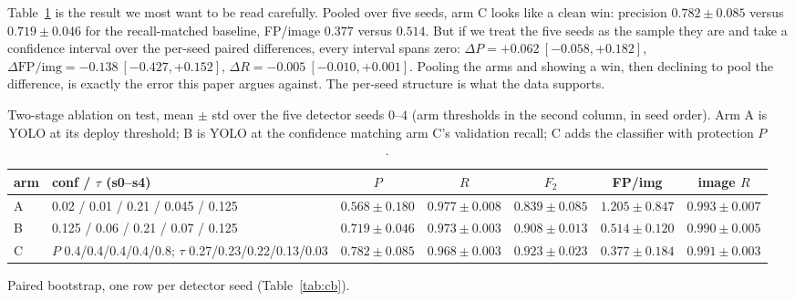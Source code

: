 Table~\ref{tab:twostage} is the result we most want to be read carefully. Pooled
over five seeds, arm C looks like a clean win: precision $0.782 \pm 0.085$ versus
$0.719 \pm 0.046$ for the recall-matched baseline, FP/image $0.377$ versus
$0.514$. But if we treat the five seeds as the sample they are and take a
confidence interval over the per-seed paired differences, every interval spans
zero: $\Delta P = +0.062\ [-0.058, +0.182]$,
$\Delta \mathrm{FP/img} = -0.138\ [-0.427, +0.152]$,
$\Delta R = -0.005\ [-0.010, +0.001]$. Pooling the arms and showing a win, then
declining to pool the difference, is exactly the error this paper argues against.
The per-seed structure is what the data supports.

\begin{table}[t]
\centering
\small
\caption{Two-stage ablation on test, mean $\pm$ std over the five detector seeds
$0$--$4$ (arm thresholds in the second column, in seed order). Arm A is YOLO at
its deploy threshold; B is YOLO at the confidence matching arm C's validation
recall; C adds the classifier with protection $P$.}
\label{tab:twostage}
\scriptsize
\setlength{\tabcolsep}{3pt}
\begin{tabular}{lp{4.1cm}ccccc}
\toprule
arm & conf / $\tau$ (s0--s4) & $P$ & $R$ & $F_2$ & FP/img & image $R$ \\
\midrule
A & 0.02 / 0.01 / 0.21 / 0.045 / 0.125 & $0.568\pm0.180$ & $0.977\pm0.008$ & $0.839\pm0.085$ & $1.205\pm0.847$ & $0.993\pm0.007$ \\
B & 0.125 / 0.06 / 0.21 / 0.07 / 0.125 & $0.719\pm0.046$ & $0.973\pm0.003$ & $0.908\pm0.013$ & $0.514\pm0.120$ & $0.990\pm0.005$ \\
C & $P$ 0.4/0.4/0.4/0.4/0.8; $\tau$ 0.27/0.23/0.22/0.13/0.03 & $0.782\pm0.085$ & $0.968\pm0.003$ & $0.923\pm0.023$ & $0.377\pm0.184$ & $0.991\pm0.003$ \\
\bottomrule
\end{tabular}
\end{table}

Paired bootstrap, one row per detector seed (Table~\ref{tab:cb}).

